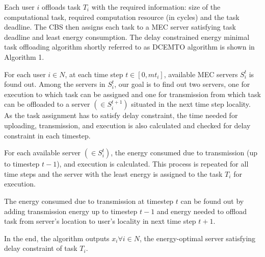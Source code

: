 \documentclass[conference]{IEEEtran}
\begin{document}
 Each user $i$ offloads task $T_i$ with the required information: size of the computational task, required computation resource (in cycles) and the task deadline. The CBS then assigns each task to a MEC server satisfying task deadline and least energy consumption. The delay constrained energy minimal task offloading algorithm shortly referred to as DCEMTO algorithm is shown in Algorithm 1. 

 For each user $i\in N$, at each time step $t\in {[0,mt_i]}$, available MEC servers $S^t_i$ is found out. Among the servers in $S^t_i$, our goal is to find out two servers, one for execution to which task can be assigned and one for transmission from which task can be offloaded to a server $({\in S}^{t+1}_i)$  situated in the next time step locality. As the task assignment has to satisfy delay constraint, the time needed for uploading, transmission, and execution is also calculated and checked for delay constraint in each timestep.

 For each available server $(\in S^t_i)$, the energy consumed due to transmission (up to timestep $t-1$), and execution is calculated. This process is repeated for all time steps and the server with the least energy is assigned to the task $T_i$ for execution. 

 The energy consumed due to transmission at timestep $t$ can be found out by adding transmission energy up to timestep $t-1$ and energy needed to offload task from server's location to user's locality in next time step $t+1$. 

 In the end, the algorithm outputs $x_i \forall i \in N$, the energy-optimal server satisfying delay constraint of task $T_i$. 
 
\end{document}
